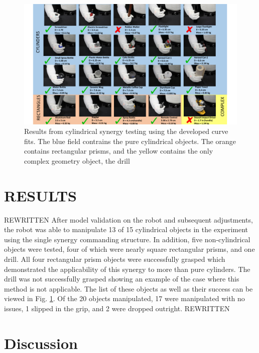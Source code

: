 \documentclass[runningheads,a4paper]{llncs}
\begin{document}
\begin{figure}[!b]
  \centering
  \includegraphics[width=1.08\linewidth]{Objects3.pdf}
  \caption{Results from cylindrical synergy testing using the developed curve fits.  The blue field contrains the pure cylindrical objects.  The orange contains rectangular prisms, and the yellow contains the only complex geometry object, the drill}
  \label{objects} 
\end{figure}

\section{RESULTS}
\label{results}

REWRITTEN
After model validation on the robot and subsequent adjustments, the robot was able to manipulate 13 of 15 cylindrical objects in the experiment using the single synergy commanding structure. In addition, five non-cylindrical objects were tested, four of which were nearly square rectangular prisms, and one drill. All four rectangular prism objects were successfully grasped which demonstrated the applicability of this synergy to more than pure cylinders. The drill was not successfully grasped showing an example of the case where this method is not applicable.  The list of these objects as well as their success can be viewed in Fig. \ref{objects}. Of the 20 objects manipulated, 17 were manipulated with no issues, 1 slipped in the grip, and 2 were dropped outright. 
REWRITTEN 

\paragraph{}
\section{Discussion}
\label{discussion}
\end{document}

